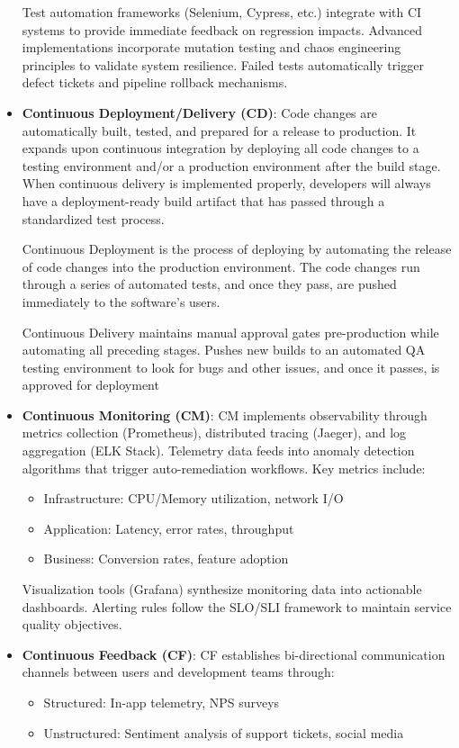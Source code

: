 \documentclass[12pt]{book}
\begin{document}
\begin{itemize}
    Test automation frameworks (Selenium, Cypress, etc.) integrate with CI systems to provide immediate feedback on regression impacts. Advanced implementations incorporate mutation testing and chaos engineering principles to validate system resilience. Failed tests automatically trigger defect tickets and pipeline rollback mechanisms.

    \item \textbf{Continuous Deployment/Delivery (CD)}:
    Code changes are automatically built, tested, and prepared for a release to production. It expands upon continuous integration by deploying all code changes to a testing environment and/or a production environment after the build stage. When continuous delivery is implemented properly, developers will always have a deployment-ready build artifact that has passed through a standardized test process.
    
    Continuous Deployment is the process of deploying by automating the release of code changes into the production environment. The code changes run through a series of automated tests, and once they pass, are pushed immediately to the software's users.
    
    Continuous Delivery maintains manual approval gates pre-production while automating all preceding stages. Pushes new builds to an automated QA testing environment to look for bugs and other issues, and once it passes, is approved for deployment 
    \item \textbf{Continuous Monitoring (CM)}:
    CM implements observability through metrics collection (Prometheus), distributed tracing (Jaeger), and log aggregation (ELK Stack). Telemetry data feeds into anomaly detection algorithms that trigger auto-remediation workflows. Key metrics include:
    \begin{itemize}
        \item Infrastructure: CPU/Memory utilization, network I/O
        \item Application: Latency, error rates, throughput
        \item Business: Conversion rates, feature adoption
    \end{itemize}

    Visualization tools (Grafana) synthesize monitoring data into actionable dashboards. Alerting rules follow the SLO/SLI framework to maintain service quality objectives.

    \item \textbf{Continuous Feedback (CF)}:
    CF establishes bi-directional communication channels between users and development teams through:
    \begin{itemize}
        \item Structured: In-app telemetry, NPS surveys
        \item Unstructured: Sentiment analysis of support tickets, social media
    \end{itemize}


\end{itemize}
\end{document}
